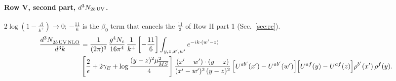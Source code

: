 \documentclass[10pt]{article}
\numberwithin{equation}{section}
\begin{document}
\paragraph{Row V, second part, $d^3N_{2b\,\rm UV}$.}
$2\log(1-\frac{\Lambda}{k^+})\to0$; $-\frac{11}{6}$ is the $\beta_0$ term that cancels the $\frac{11}{3}$ of Row II part 1 (Sec.~\ref{sec:rc}).
\begin{align}
\frac{d^{3}N_{2b\,\rm UV\, NLO}^{\rm}}{d^{3}k} & =  \frac{1}{(2\pi)^{3}}\,\frac{g^{4}N_{c}}{16\pi^{4}}\,\frac{1}{k^{+}}
\left[-\frac{11}{6}\right]\int_{y,z,x',w'}e^{-ik\cdot(w'-z)}\notag \\ & \left[\frac{2}{\epsilon}+2\gamma_{E}+\log\frac{(y-z)^{2}\mu^{2}_{\overline{MS}}}{4}\right]
\frac{(x'-w')\cdot(y-z)}{(x'-w')^{2}\,(y-z)^{2}}\, \Big[U^{ab'}(x')-U^{ab'}(w')\Big]\Big[U^{af}(y)-U^{af}(z)\Big]\rho^{b'}(x')\,\rho^{f}(y). \label{eq:F:G1V2bUV}
\end{align}
\end{document}
